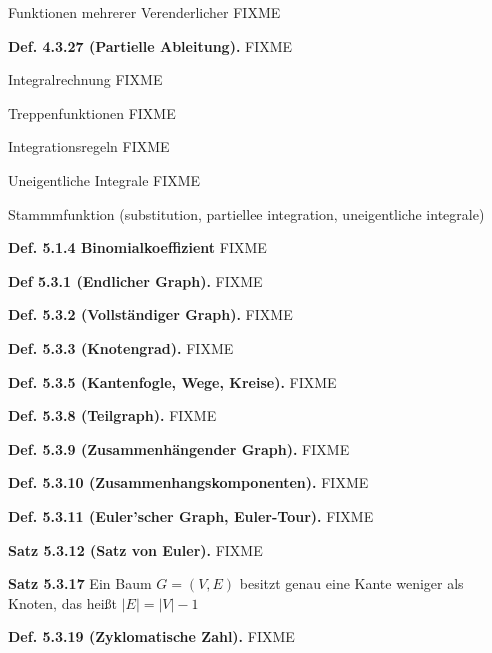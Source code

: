 \documentclass[ngerman]{article}
\begin{document}
\begin{multicols}{4}
\begin{tiny}
Funktionen mehrerer Verenderlicher FIXME

\textbf{Def. 4.3.27 (Partielle Ableitung).} FIXME

Integralrechnung FIXME

Treppenfunktionen FIXME

Integrationsregeln FIXME

Uneigentliche Integrale FIXME

Stammmfunktion (substitution, partiellee integration, uneigentliche integrale)

\textbf{Def. 5.1.4 Binomialkoeffizient} FIXME

\textbf{Def 5.3.1 (Endlicher Graph).} FIXME 

\textbf{Def. 5.3.2 (Vollständiger Graph).} FIXME

\textbf{Def. 5.3.3 (Knotengrad).} FIXME

\textbf{Def. 5.3.5 (Kantenfogle, Wege, Kreise).} FIXME

\textbf{Def. 5.3.8 (Teilgraph).} FIXME

\textbf{Def. 5.3.9 (Zusammenhängender Graph).} FIXME

\textbf{Def. 5.3.10 (Zusammenhangskomponenten).} FIXME

\textbf{Def. 5.3.11 (Euler\textquoteright{}scher Graph, Euler-Tour).} FIXME

\textbf{Satz 5.3.12 (Satz von Euler).} FIXME

\textbf{Satz 5.3.17} Ein Baum $G=(V,E)$ besitzt genau eine Kante
weniger als Knoten, das heißt $\vert E\vert=\vert V\vert-1$

\textbf{Def. 5.3.19 (Zyklomatische Zahl).} FIXME

\end{tiny}
\end{multicols}
\end{document}
